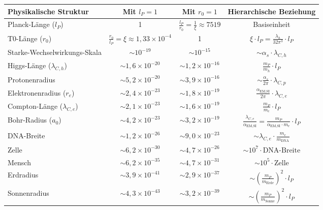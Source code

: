 \documentclass[12pt,a4paper]{article}
\newcommand{\alphaEMSI}{\alpha_{\text{EM,SI}}}
\begin{document}
\begin{table}[H]
	\centering
	\begin{adjustbox}{width=\textwidth}
		\begin{tabular}{lccc}
			\toprule
			\textbf{Physikalische Struktur} & \textbf{Mit \(l_P = 1\)} & \textbf{Mit \(r_0 = 1\)} & \textbf{Hierarchische Beziehung} \\
			\midrule
			Planck-Länge (\(l_P\)) & 1 & \(\frac{l_P}{r_0} = \frac{1}{\xi} \approx 7519\) & Basiseinheit \\
			T0-Länge (\(r_0\)) & \(\frac{r_0}{l_P} = \xi \approx 1,33 \times 10^{-4}\) & 1 & \(\xi \cdot l_P = \frac{\lambda_h}{32\pi^3} \cdot l_P\) \\
			Starke-Wechselwirkungs-Skala & \(\sim 10^{-19}\) & \(\sim 10^{-15}\) & \(\sim \alpha_s \cdot \lambda_{C,h}\) \\
			Higgs-Länge (\(\lambda_{C,h}\)) & \(\sim 1,6 \times 10^{-20}\) & \(\sim 1,2 \times 10^{-16}\) & \(\frac{m_P}{m_h} \cdot l_P\) \\
			Protonenradius & \(\sim 5,2 \times 10^{-20}\) & \(\sim 3,9 \times 10^{-16}\) & \(\sim \frac{\alpha_s}{2\pi} \cdot \lambda_{C,p}\) \\
			Elektronenradius (\(r_e\)) & \(\sim 2,4 \times 10^{-23}\) & \(\sim 1,8 \times 10^{-19}\) & \(\frac{\alphaEMSI}{2\pi} \cdot \lambda_{C,e}\) \\
			Compton-Länge (\(\lambda_{C,e}\)) & \(\sim 2,1 \times 10^{-23}\) & \(\sim 1,6 \times 10^{-19}\) & \(\frac{m_P}{m_e} \cdot l_P\) \\
			Bohr-Radius (\(a_0\)) & \(\sim 4,2 \times 10^{-23}\) & \(\sim 3,2 \times 10^{-19}\) & \(\frac{\lambda_{C,e}}{\alphaEMSI} = \frac{m_P}{\alphaEMSI \cdot m_e} \cdot l_P\) \\
			DNA-Breite & \(\sim 1,2 \times 10^{-26}\) & \(\sim 9,0 \times 10^{-23}\) & \(\sim \lambda_{C,e} \cdot \frac{m_e}{m_{\mathrm{DNA}}}\) \\
			Zelle & \(\sim 6,2 \times 10^{-30}\) & \(\sim 4,7 \times 10^{-26}\) & \(\sim 10^7 \cdot \text{DNA-Breite}\) \\
			Mensch & \(\sim 6,2 \times 10^{-35}\) & \(\sim 4,7 \times 10^{-31}\) & \(\sim 10^5 \cdot \text{Zelle}\) \\
			Erdradius & \(\sim 3,9 \times 10^{-41}\) & \(\sim 2,9 \times 10^{-37}\) & \(\sim \left(\frac{m_P}{m_{\mathrm{Erde}}}\right)^2 \cdot l_P\) \\
			Sonnenradius & \(\sim 4,3 \times 10^{-43}\) & \(\sim 3,2 \times 10^{-39}\) & \(\sim \left(\frac{m_P}{m_{\mathrm{Sonne}}}\right)^2 \cdot l_P\) \\

\end{tabular}
\end{adjustbox}
\end{table}
\end{document}
